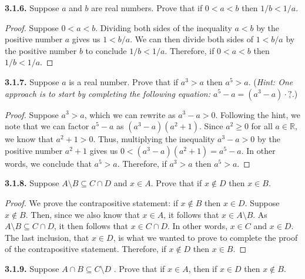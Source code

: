 \documentclass[12pt]{amsart}
\newenvironment{statement}[1]{\smallskip\noindent\color[rgb]{.6627, .3529, .6314} {\bf #1.}}{}
\theoremstyle{definition}
\theoremstyle{remark}
\newcommand{\BR}{\mathbb R}
\begin{document}
\begin{statement}{3.1.6}
Suppose $a$ and $b$ are real numbers.
Prove that if $0 < a < b$ then $1/b < 1/a$.
\end{statement}

\begin{proof}
Suppose $0 < a < b$.
Dividing both sides of the inequality $a < b$ by the positive number $a$ gives us $1 < b/a$.
We can then divide both sides of $1 < b/a$ by the positive number $b$ to conclude $1/b < 1/a$.
Therefore, if $0 < a < b$ then $1/b < 1/a$.
\end{proof}


\begin{statement}{3.1.7}
Suppose $a$ is a real number.
Prove that if $a^3 > a$ then $a^5 > a$.
(\emph{Hint: One approach is to start by completing the following equation:
$a^5 - a = (a^3 - a) \cdot \underline{?}$.})
\end{statement}

\begin{proof}
Suppose $a^3 > a$, which we can rewrite as $a^3 - a > 0$.
Following the hint, we note that we can factor $a^5 - a$ as $(a^3 - a)(a^2 + 1)$.
Since $a^2 \geq 0$ for all $a \in \BR$, we know that $a^2 + 1 > 0$.
Thus, multiplying the inequality $a^3 - a > 0$ by the positive number $a^2 + 1$
gives us $0 < (a^3 - a)(a^2 + 1) = a^5 - a$.
In other words, we conclude that $a^5 > a$.
Therefore, if $a^3 > a$ then $a^5 > a$.
\end{proof}


\begin{statement}{3.1.8}
Suppose $A \setminus B \subseteq C \cap D$ and $x \in A$.
Prove that if $x \notin D$ then $x \in B$.
\end{statement}

\begin{proof}
We prove the contrapositive statement: if $x \notin B$ then $x \in D$.
Suppose $x \notin B$.
Then, since we also know that $x \in A$, it follows that $x \in A \setminus B$.
As $A \setminus B \subseteq C \cap D$, it then follows that $x \in C \cap D$.
In other words, $x \in C$ and $x \in D$.
The last inclusion, that $x \in D$, is what we wanted to prove to complete the proof of the contrapositive statement.
Therefore, if $x \notin D$ then $x \in B$.
\end{proof}


\begin{statement}{3.1.9}
Suppose $A \cap B \subseteq C \setminus D$ .
Prove that if $x \in A$, then if $x \in D$ then $x \notin B$.
\end{statement}
\end{document}
